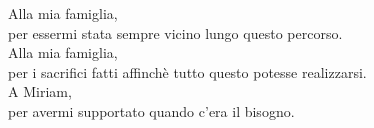 \newpage\null\thispagestyle{empty}\newpage %
\thispagestyle{empty}
\newenvironment{dedication}
  {\clearpage           %
   \thispagestyle{empty}%
   \vspace*{\stretch{1}}%
   \itshape             %
   \raggedleft          %
  }
  {\par %
   \vspace{\stretch{3}} %
   \clearpage           %
  }

\begin{dedication}
Alla mia famiglia, \\per essermi stata sempre vicino lungo questo percorso.\\
Alla mia famiglia, \\per i sacrifici fatti affinchè tutto questo potesse realizzarsi.\\
A Miriam, \\per avermi supportato quando c'era il bisogno.

\end{dedication}
